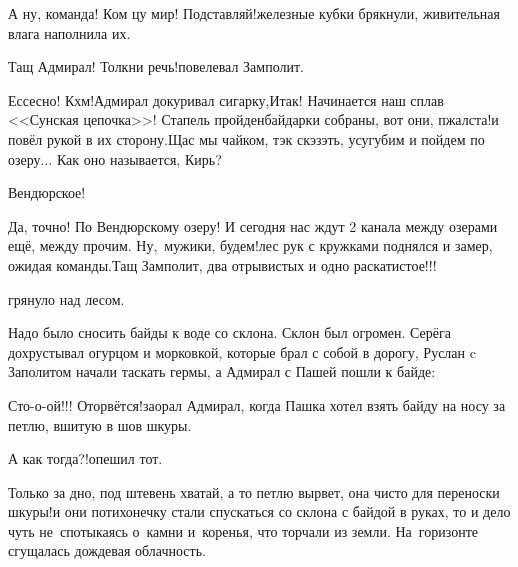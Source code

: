 \diagdash А ну, команда! Ком цу мир! Подставляй!\mdash железные кубки брякнули, живительная влага наполнила их.

\diagdash Тащ Адмирал! Толкни речь!\mdash повелевал Замполит.

\diagdash Ессесно! Кхм!\mdash Адмирал докуривал сигарку,\mdash Итак! Начинается наш сплав <<Сунская цепочка>>! Стапель пройден\mdash байдарки собраны, вот они, пжалста!\mdash и повёл рукой в их сторону.\mdash Щас мы чайком, тэк скэзэть, усугубим и пойдем по озеру$\ldots$ Как оно называется, Кирь?

\diagdash Вендюрское! 

\diagdash Да, точно! По Вендюрскому озеру! И сегодня нас ждут 2 канала между озерами ещё, между прочим. Ну,~мужики, будем!\mdash лес рук с кружками поднялся и замер, ожидая команды.\mdash Тащ Замполит, два отрывистых и одно раскатистое!!!

\mdash грянуло над лесом.

Надо было сносить байды к воде со склона. Склон был огромен. Серёга дохрустывал огурцом и морковкой, которые брал с собой в дорогу, Руслан c Заполитом начали таскать гермы, а Адмирал с Пашей пошли к байде:

\diagdash Сто-о-ой!!! Оторвётся!\mdash заорал Адмирал, когда Пашка хотел взять байду на носу за петлю, вшитую в шов шкуры.

\diagdash А как тогда?!\mdash опешил тот.

\diagdash Только за дно, под штевень хватай, а то петлю вырвет, она чисто для переноски шкуры!\mdash и они потихонечку стали спускаться со склона с байдой в руках, то и дело чуть не~спотыкаясь о~камни и~коренья, что торчали из земли. На~горизонте сгущалась дождевая облачность.






\begin{center}
\end{center}
